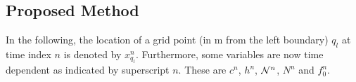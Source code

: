 \subsection{Proposed Method}\label{sec:proposedMethod}
In the following, the location of a grid point (in m from the left boundary) $q_l$ at time index $n$ is denoted by $x_{q_l}^n$. %
Furthermore, some variables are now time dependent as indicated by superscript $n$. These are $c^n$, $h^n$, $\mathcal{N}^n$, $N^n$ and $f_0^n$.

